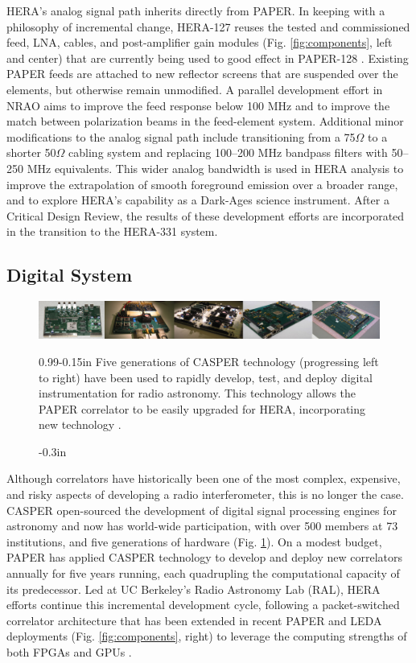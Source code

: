 \documentclass[ars]{/Users/daviddeboer1/Documents/Papers/Copernicus_LaTeX_Package_v_2_7/copernicus}
\begin{document}
HERA's analog signal path inherits directly from PAPER.
In keeping with a philosophy of
incremental change,
HERA-127 reuses the tested and commissioned feed, LNA, cables, and post-amplifier gain modules
(Fig. \ref{fig:components}, left and center) that are currently being
used to good effect in PAPER-128 \citep{parsons_et_al2010}.  Existing PAPER feeds are attached to new
reflector screens that are suspended over the elements, but otherwise remain unmodified.
A parallel development effort in NRAO aims to improve the feed response below
100 MHz 
and to improve the match between polarization beams in the feed-element system.  
Additional
minor modifications to the analog signal path include transitioning from a 75$\Omega$ to a
shorter 50$\Omega$ cabling system and replacing 100--200 MHz bandpass filters with 50--250 MHz equivalents.
This wider analog bandwidth is used in HERA analysis to improve the extrapolation of smooth foreground
emission over a broader range, and to explore HERA's capability as a Dark-Ages science instrument.
After a Critical Design Review, the results of these development efforts are incorporated in
the transition to the HERA-331 system.  


\subsection{Digital System}
\label{sec:digital}

\begin{figure}[t]\centering
\includegraphics[width=6.5in]{plots/casper_boards.jpg}
\caption{-0.3in}{0.99}{-0.15in}{\small
Five generations of CASPER technology (progressing left to right) have been used to rapidly
develop, test, and deploy digital instrumentation for radio astronomy.  This technology
allows the PAPER correlator to be 
easily upgraded for HERA, incorporating new technology
\citep{parsons_et_al2006,parsons_et_al2008}.
}\label{fig:casper_boards}
\end{figure}

Although correlators have historically been one of the most complex,
expensive, and risky aspects of developing a radio interferometer, this is no longer the case.
CASPER \citep{parsons_et_al2006}
open-sourced the development of digital signal processing engines for astronomy and
now has world-wide participation,
with over 500 members at 73 institutions, and 
five generations of hardware (Fig. \ref{fig:casper_boards}). 
On a modest budget, PAPER has applied CASPER technology to develop and deploy new correlators
annually for five years running, each quadrupling the computational capacity of its predecessor.
Led at UC Berkeley's Radio Astronomy Lab (RAL),
HERA efforts continue this incremental development cycle, following a packet-switched
correlator architecture \citep{parsons_et_al2008} that has been
extended in recent PAPER and LEDA deployments (Fig. \ref{fig:components}, right)
to leverage the computing strengths of both FPGAs and GPUs \citep{clark_et_al2011}.
\end{document}
